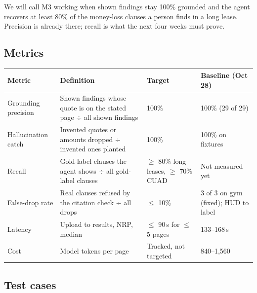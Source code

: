 \documentclass[11pt,letterpaper]{article}
\begin{document}
We will call M3 working when shown findings stay 100\% grounded and the agent recovers at least 80\% of the money-loss clauses a person finds in a long lease. Precision is already there; recall is what the next four weeks must prove.

\subsection{Metrics}

\begin{table}[htbp]
\centering
\small
\begin{tabularx}{\textwidth}{@{}p{2.6cm}Lp{2.6cm}p{2.9cm}@{}}
\toprule
\textbf{Metric} & \textbf{Definition} & \textbf{Target} & \textbf{Baseline (Oct 28)} \\
\midrule
Grounding precision & Shown findings whose quote is on the stated page $\div$ all shown findings & 100\% & 100\% (29 of 29) \\
Hallucination catch & Invented quotes or amounts dropped $\div$ invented ones planted & 100\% & 100\% on fixtures \\
Recall & Gold-label clauses the agent shows $\div$ all gold-label clauses & $\ge$ 80\% long leases, $\ge$ 70\% CUAD & Not measured yet \\
False-drop rate & Real clauses refused by the citation check $\div$ all drops & $\le$ 10\% & 3 of 3 on gym (fixed); HUD to label \\
Latency & Upload to results, NRP, median & $\le$ 90\,s for $\le$ 5 pages & 133--168\,s \\
Cost & Model tokens per page & Tracked, not targeted & 840--1,560 \\
\bottomrule
\end{tabularx}
\end{table}

\subsection{Test cases}
\end{document}
